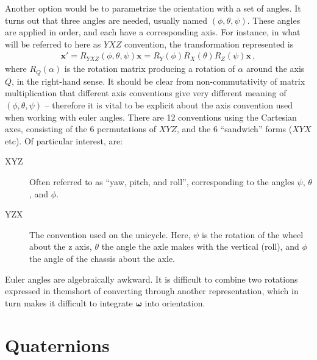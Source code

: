 \documentclass[main.tex]{subfiles}
\begin{document}
Another option would be to parametrize the orientation with a set of angles.
It turns out that three angles are needed, usually named $(\phi, \theta, \psi)$.
These angles are applied in order, and each have a corresponding axis. For instance, in what will be referred to here as $YXZ$ convention\footnotemark, the transformation represented is
\begin{align}
	\bm{x}' = R_{YXZ}(\phi, \theta, \psi)\bm{x} = R_Y(\phi)R_X(\theta)R_Z(\psi) \bm{x}\,,
	\label{eq:euler-matrix}
\end{align}
where $R_Q(\alpha)$ is the rotation matrix producing a rotation of $\alpha$ around the axis $Q$, in the right-hand sense. It should be clear from non-commutativity of matrix multiplication that different axis conventions give very different meaning of $(\phi, \theta, \psi)$ -- therefore it is vital to be explicit about the axis convention used when working with euler angles. There are 12 conventions using the Cartesian axes, consisting of the 6 permutations of $XYZ$, and the 6 \enquote{sandwich} forms ($XYX$ etc). Of particular interest, are:
\begin{description}
	\item[XYZ]
		Often referred to as \enquote{yaw, pitch, and roll}\footnotemark, corresponding to the angles $\psi$, $\theta$, and $\phi$.
	\item[YZX]
		The convention used on the unicycle. Here, $\psi$ is the rotation of the wheel about the z axis, $\theta$ the angle the axle makes with the vertical (roll), and $\phi$ the angle of the chassis about the axle.
\end{description}
Euler angles are algebraically awkward. It is difficult to combine two rotations expressed in them\footnotemark short of converting through another representation, which in turn makes it difficult to integrate $\bm{\omega}$ into orientation.



\section{Quaternions}
\end{document}
